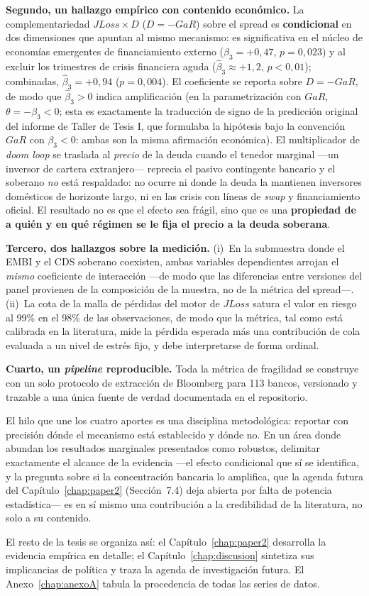\textbf{Segundo, un hallazgo empírico con contenido económico.} La complementariedad $JLoss\times D$ ($D=-GaR$) sobre el spread es \textbf{condicional} en dos dimensiones que apuntan al mismo mecanismo: es significativa en el núcleo de economías emergentes de financiamiento externo ($\hat\beta_3=+0{,}47$, $p=0{,}023$) y al excluir los trimestres de crisis financiera aguda ($\hat\beta_3\approx+1{,}2$, $p<0{,}01$); combinadas, $\hat\beta_3=+0{,}94$ ($p=0{,}004$). El coeficiente se reporta sobre $D=-GaR$, de modo que $\hat\beta_3>0$ indica amplificación (en la parametrización con $GaR$, $\theta=-\beta_3<0$; esta es exactamente la traducción de signo de la predicción original del informe de Taller de Tesis I, que formulaba la hipótesis bajo la convención $GaR$ con $\beta_3<0$: ambas son la misma afirmación económica). El multiplicador de \textit{doom loop} se traslada al \emph{precio} de la deuda cuando el tenedor marginal —un inversor de cartera extranjero— reprecia el pasivo contingente bancario y el soberano \emph{no} está respaldado: no ocurre ni donde la deuda la mantienen inversores domésticos de horizonte largo, ni en las crisis con líneas de \textit{swap} y financiamiento oficial. El resultado no es que el efecto sea frágil, sino que es una \textbf{propiedad de a quién y en qué régimen se le fija el precio a la deuda soberana}.

\textbf{Tercero, dos hallazgos sobre la medición.} (i)~En la submuestra donde el EMBI y el CDS soberano coexisten, ambas variables dependientes arrojan el \emph{mismo} coeficiente de interacción —de modo que las diferencias entre versiones del panel provienen de la composición de la muestra, no de la métrica del spread—. (ii)~La cota de la malla de pérdidas del motor de $JLoss$ satura el valor en riesgo al 99\% en el 98\% de las observaciones, de modo que la métrica, tal como está calibrada en la literatura, mide la pérdida esperada más una contribución de cola evaluada a un nivel de estrés fijo, y debe interpretarse de forma ordinal.

\textbf{Cuarto, un \textit{pipeline} reproducible.} Toda la métrica de fragilidad se construye con un solo protocolo de extracción de Bloomberg para 113 bancos, versionado y trazable a una única fuente de verdad documentada en el repositorio.

El hilo que une los cuatro aportes es una disciplina metodológica: reportar con precisión dónde el mecanismo está establecido y dónde no. En un área donde abundan los resultados marginales presentados como robustos, delimitar exactamente el alcance de la evidencia —el efecto condicional que sí se identifica, y la pregunta sobre si la concentración bancaria lo amplifica, que la agenda futura del Capítulo~\ref{chap:paper2} (Sección~7.4) deja abierta por falta de potencia estadística— es en sí mismo una contribución a la credibilidad de la literatura, no solo a su contenido.

El resto de la tesis se organiza así: el Capítulo~\ref{chap:paper2} desarrolla la evidencia empírica en detalle; el Capítulo~\ref{chap:discusion} sintetiza sus implicancias de política y traza la agenda de investigación futura. El Anexo~\ref{chap:anexoA} tabula la procedencia de todas las series de datos.
